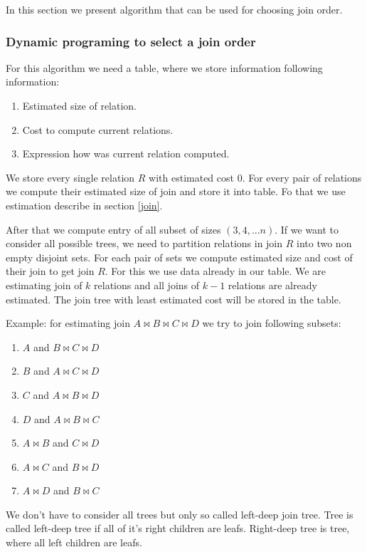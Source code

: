 In this section we present algorithm that can be used for choosing join order.
 
\subsubsection{Dynamic programing to select a join order}
 
For this algorithm we need a table, where we store information following information:
 
\begin{enumerate}
\item Estimated size of relation.
\item Cost to compute current relations.
\item Expression how was current relation computed.
\end{enumerate}

We store every single relation $R$ with estimated cost 0. For every pair of relations we compute their estimated size of join and store it into table. Fo that we use estimation describe in section \ref{join}.  

After that we compute entry of all subset of sizes $(3,4,...n)$.
If we want to consider all possible trees, we need to partition relations in join $R$ into two non empty disjoint sets. For each pair of sets we compute estimated size and cost of their join to get join $R$. For this we use data already in our table. We are estimating join of $k$ relations and all joins of $k-1$ relations are already estimated. The join tree with least estimated cost will be stored in the table.

Example: for estimating join $A\Join B\Join C\Join D$ we try to join following subsets:
\begin{enumerate}
\item $A$ and $B\Join C\Join D$
\item $B$ and $A\Join C\Join D$
\item $C$ and $A\Join B\Join D$
\item $D$ and $A\Join B\Join C$
\item $A\Join B$ and $C\Join D$
\item $A\Join C$ and $B\Join D$
\item $A\Join D$ and $B\Join C$

\end{enumerate}

We don't have to consider all trees but only so called left-deep join tree. Tree is called left-deep tree if all of it's right children are leafs. Right-deep tree is tree, where all left children are leafs.
 
